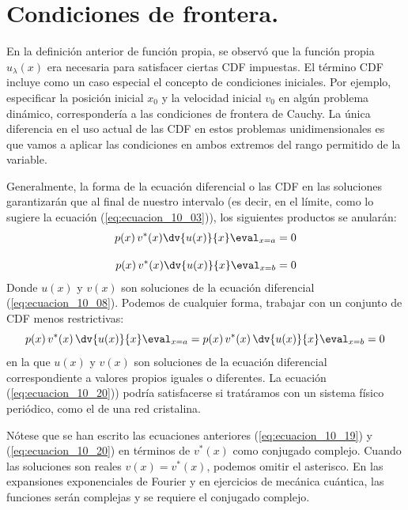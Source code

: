 \section{Condiciones de frontera.}
En la definición anterior de función propia, se observó que la función propia $u_{\lambda} (x)$ era necesaria para satisfacer ciertas CDF impuestas. El término CDF incluye como un caso especial el concepto de condiciones iniciales. Por ejemplo, especificar la posición inicial $x_{0}$ y la velocidad inicial $v_{0}$ en algún problema dinámico, correspondería a las condiciones de frontera de Cauchy. La única diferencia en el uso actual de las CDF en estos problemas unidimensionales es que vamos a aplicar las condiciones en ambos extremos del rango permitido de la variable.
\par
Generalmente, la forma de la ecuación diferencial o las CDF en las soluciones garantizarán que al final de nuestro intervalo (es decir, en el límite, como lo sugiere la ecuación (\ref{eq:ecuacion_10_03})), los siguientes productos se anularán:
\begin{align}
\begin{aligned}
p(x) \, v^{*}(x) \dv{u(x)}{x} \eval_{x = a} = 0 \\[1em]
p(x) \, v^{*}(x) \dv{u(x)}{x} \eval_{x = b} = 0
\label{eq:ecuacion_10_19}
\end{aligned}
\end{align}
Donde $u(x)$ y $v(x)$ son soluciones de la ecuación diferencial (\ref{eq:ecuacion_10_08}). Podemos de cualquier forma, trabajar con un conjunto de CDF menos restrictivas:
\begin{equation}
p(x) \, v^{*}(x) \, \dv{u(x)}{x} \eval_{x = a} = p(x) \, v^{*}(x) \, \dv{u(x)}{x} \eval_{x = b} = 0
\label{eq:ecuacion_10_20}
\end{equation}
en la que $u(x)$ y $v(x)$ son soluciones de la ecuación diferencial correspondiente a valores propios iguales o diferentes. La ecuación (\ref{eq:ecuacion_10_20})) podría satisfacerse si tratáramos con un sistema físico periódico, como el de una red cristalina.
\par
Nótese que se han escrito las ecuaciones anteriores  (\ref{eq:ecuacion_10_19}) y (\ref{eq:ecuacion_10_20}) en términos de $v^{*}(x)$ como conjugado complejo. Cuando las soluciones son reales $v(x) = v^{*}(x)$, podemos omitir el asterisco. En las expansiones exponenciales de Fourier y en ejercicios de mecánica cuántica, las funciones serán complejas y se requiere el conjugado complejo.
\newpage
